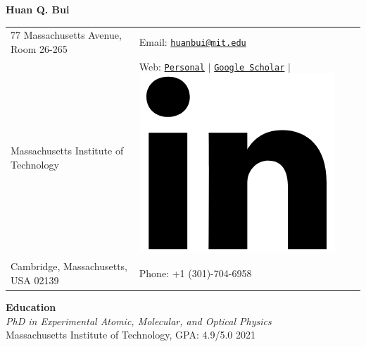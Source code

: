 \documentclass[10pt]{article}
\begin{document}
\noindent  
\begin{center}
{\Huge{\textbf{Huan Q. Bui}}}
\end{center}
\vspace{-10pt}
\hrulefill
\vspace{-1ex}

\normalsize

\begin{center}
\begin{tabular}{l l}
     77 Massachusetts Avenue, Room 26-265		 & \hspace{1in} Email: \href{mailto:huanbui@mit.edu}{\texttt{huanbui@mit.edu}} \\
     Massachusetts Institute of Technology				 & \hspace{1in}  Web: \href{https://huanqbui.com}{\texttt{Personal}} 
     $\vert$ 	\href{https://scholar.google.com/citations?user=ejxM5pkAAAAJ\&hl=en}{\texttt{Google Scholar}} 
     $\vert$ 					\href{https://www.linkedin.com/in/huan-bui/}{\includegraphics[scale=0.04]{linkedin_logo.PNG}} \\
 	Cambridge, Massachusetts, USA 02139 & \hspace{1in} Phone: +1 (301)-704-6958\\
\end{tabular}
\end{center}




\vspace{10pt}
\noindent\large{\textbf{{Education}}} \normalsize\\

\vspace{-5pt}
\noindent \textit{PhD in Experimental Atomic, Molecular, and Optical Physics} \\
Massachusetts Institute of Technology, GPA: 4.9/5.0 \hfill {2021\textendash}\\
\end{document}
